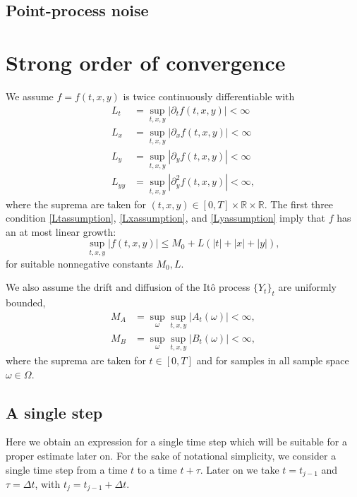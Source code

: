 \documentclass[reqno,12pt]{amsart}
\theoremstyle{plain}%
\theoremstyle{definition}
\begin{document}
\subsection{Point-process noise}



\section{Strong order of convergence}

We assume $f=f(t, x, y)$ is twice continuously differentiable with
\begin{align}
  \label{Ltassumption} L_t & = \sup_{t, x, y} |\partial_t f(t, x, y)| < \infty \\
  \label{Lxassumption} L_x & = \sup_{t, x, y} |\partial_x f(t, x, y)| < \infty \\
  \label{Lyassumption} L_y & = \sup_{t, x, y} |\partial_y f(t, x, y)| < \infty \\
  \label{Lyyassumption} L_{yy} & = \sup_{t, x, y} |\partial_y^2 f(t, x, y)| < \infty,
\end{align}
where the suprema are taken for $(t, x, y) \in [0, T] \times \mathbb{R} \times \mathbb{R}$. The first three condition \eqref{Ltassumption}, \eqref{Lxassumption}, and \eqref{Lyassumption} imply that $f$ has an at most linear growth:
\begin{equation}
    \label{Mfassumption}
    \sup_{t, x, y} |f(t, x, y)| \leq M_0 + L(|t| + |x| + |y|),
\end{equation}
for suitable nonnegative constants $M_0, L$.

We also assume the drift and diffusion of the It\^o process $\{Y_t\}_t$ are uniformly bounded,
\begin{align}
  \label{MAassumption} M_A & = \sup_\omega \sup_{t, x, y} |A_t(\omega)| < \infty, \\
  \label{MBassumption} M_B & = \sup_\omega\sup_{t, x, y} |B_t(\omega)| < \infty,
\end{align}
where the suprema are taken for $t\in [0, T]$ and for samples in all sample space $\omega\in \Omega$.

\subsection{A single step}

Here we obtain an expression for a single time step which will be suitable for a proper estimate later on. For the sake of notational simplicity, we consider a single time step from a time $t$ to a time $t + \tau$. Later on we take $t=t_{j-1}$ and $\tau = \Delta t$, with $t_j = t_{j-1}+\Delta t$.
\end{document}

